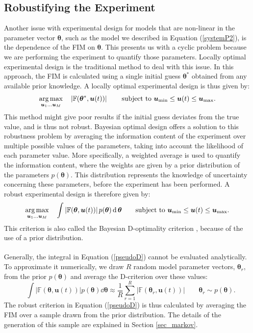 \subsection{Robustifying the Experiment}
Another issue with experimental design for models that are non-linear in the parameter vector $\bm \theta$, such as the model we described in Equation (\ref{systemP2}), is the dependence of the FIM on $\bm \theta$. This presents us with a cyclic problem because we are performing the experiment to quantify those parameters. Locally optimal experimental design is the traditional method to deal with this issue. In this approach, the FIM is calculated using a single initial guess $\bm \theta^*$ obtained from any available prior knowledge. A locally optimal experimental design is thus given by:
\begin{equation}
\operatorname*{arg\,max}_{\bm u_1 \ldots \bm u_M} \quad \left | \mathbb{F}(\bm \theta^*, \bm u(t)) \right |
\qquad \text{subject to } \bm u_{\min} \leq \bm u(t) \leq \bm u_{\max}.
\label{localD}
\end{equation}
This method might give poor results if the initial guess deviates from the true value, and is thus not robust. Bayesian optimal design offers a solution to this robustness problem by averaging the information content of the experiment over multiple possible values of the parameters, taking into account the likelihood of each parameter value. More specifically, a weighted average is used to quantify the information content, where the weights are given by a prior distribution of the parameters $p(\bm \theta)$. This distribution represents the {\color{red}knowledge} of uncertainty concerning these parameters, before the experiment has been performed. A robust experimental design is therefore given by:
\begin{equation}
\operatorname*{arg\,max}_{\bm u_1 \ldots \bm u_M} \quad \int \left | \mathbb{F}(\bm \theta, \bm u(t)) \right | p(\bm \theta) \operatorname{\mathrm{d}} \bm \theta
\qquad \text{subject to } \bm u_{\min} \leq \bm u(t) \leq \bm u_{\max}.
\label{pseudoD}
\end{equation}
This criterion is also called the Bayesian D-optimality criterion \parencite{chaloner}, because of the use of a prior distribution.
\\
\\
Generally, the integral in Equation (\ref{pseudoD}) cannot be evaluated analytically. To approximate it numerically, we draw $R$ random model parameter vectors, $\bm \theta_r$, from the prior $p(\bm \theta)$ and average the D-criterion over these values:
\begin{equation}
\label{pseudoDcalc}
\quad \int \left | \mathbb{F}(\bm \theta, \bm u(t)) \right | p(\bm \theta) \dd \bm \theta
\approx \frac{1}{R} \sum_{r=1}^{R} \left | \mathbb{F}(\bm \theta_{r}, \bm u(t)) \right |
\qquad   \bm \theta_r \sim p(\bm \theta).
\end{equation}
The robust criterion in Equation (\ref{pseudoD}) is thus calculated by averaging the FIM over a sample drawn from the prior distribution. The details of the generation of this sample are explained in Section \ref{sec_markov}. 

